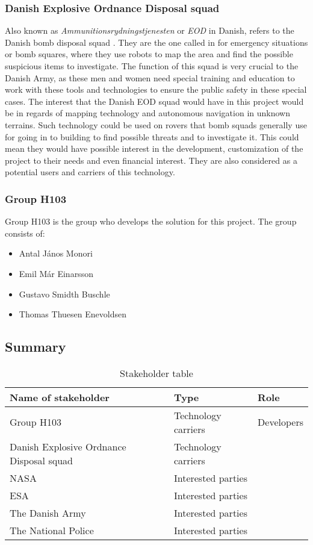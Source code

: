 \subsubsection{Danish Explosive Ordnance Disposal squad} 
Also known as \textit{Ammunitionsrydningstjenesten} or \textit{EOD} in Danish, refers to the Danish bomb disposal squad \cite{EOD}. %
They are the one called in for emergency situations or bomb squares, where they use robots to map the area and find the possible suspicious items to investigate. The function of this squad is very crucial to the Danish Army, as these men and women need special training and education to work with these tools and technologies to ensure the public safety in these special cases. The interest that the Danish EOD squad would have in this project would be in regards of mapping technology and autonomous navigation in unknown terrains. Such technology could be used on rovers that bomb squads generally use for going in to building to find possible threats and to investigate it. This could mean they would have possible interest in the development, customization of the project to their needs and even financial interest. They are also considered as a potential users and carriers of this technology.

\subsubsection{Group H103}	
Group H103 is the group who develops the solution for this project. The group consists of:
\begin{itemize}
	\item Antal János Monori
	\item Emil Már Einarsson
	\item Gustavo Smidth Buschle
	\item Thomas Thuesen Enevoldsen
\end{itemize}

\subsection{Summary}
\begin{table}[H]
	\begin{tabular}{ | p{5cm} | l | p{5cm} |}
	   	\hline
	   	\bfseries Name of stakeholder & \bfseries Type & \bfseries Role \\ \hline
	   	Group H103 & Technology carriers & Developers \\ \hline
	   	Danish Explosive Ordnance Disposal squad & Technology carriers &  \\ \hline
 	   	NASA & Interested parties &  \\ \hline
 	   	ESA & Interested parties &  \\ \hline
 	   	The Danish Army & Interested parties & \\ \hline
 	   	The National Police & Interested parties &  \\
	   	\hline
	\end{tabular}
	\caption{Stakeholder table}
	\label{table:stakeholdertable}
\end{table}

